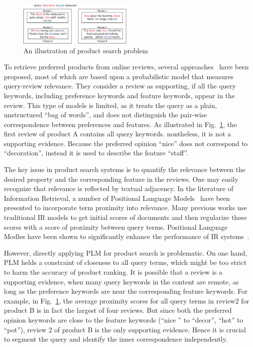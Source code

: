 \documentclass[preprint]{elsarticle}
\begin{document}
\begin{figure}
\centering
\includegraphics[width=0.5\textwidth]{example.eps}
\caption{An illustration of product search problem}
\label{fig:example}
\end{figure}

To retrieve preferred products from online reviews, several approaches~\cite{Ganesan2012Opinion,Li2011Towards,Duan2013Supporting} have been proposed, most of which are based upon a probabilistic model that measures query-review relevance. They consider a review as supporting, if all the query keywords, including preference keywords and feature keywords, appear in the review. This type of models is limited, as it treats the query as a plain, unstructured ``bag of words'', and does not distinguish the pair-wise correspondence between preferences and features. As illustrated in Fig.~\ref{fig:example}, the first review of product A contains all query keywords. nontheless, it is not a supporting evidence. Because the preferred opinion ``nice'' does not correspond to ``decoration'', instead it is used to describe the feature ``staff''.

The key issue in product search systems is to quantify the relevance between the desired property and the corresponding feature in the reviews. One may easily recognize that relevance is reflected by textual adjacency. In the literature of Information Retrieval, a number of Positional Language Models~\cite{Lv2009Positional,He2011Modeling} have been presented to incorporate term proximity into relevance. Many previous works use traditional IR models to get initial scores of documents and then regularize these scores with a score of proximity between query terms. Positional Language Modles have been shown to significantly enhance the performance of IR systems~\cite{Zhai2008Statistical}. 

However, directly applying PLM for product search is problematic. On one hand, PLM helds a constraint of closeness to all query terms, which might be too strict to harm the accuracy of product ranking. It is possible that a review is a supporting evidence, when many query keywords in the content are remote, as long as the preference keywords are near the corresponding feature keywords. For example, in Fig.~\ref{fig:example}, the average proximity scores for all query terms in review2 for product B is in fact the largest of four reviews. But since both the preferred opinion keywords are close to the feature keywords (``nice '' to ``decor'', ``hot'' to ``pot''), review 2 of product B is the only supporting evidence. Hence it is crucial to segment the query and identify the inner correspondence independently.
\end{document}
